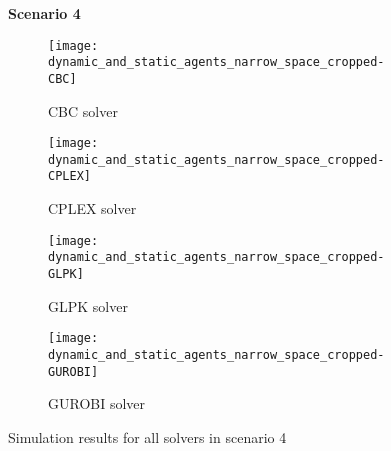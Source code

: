 \begin{figure}[H]
    \centering
    \textbf{Scenario 4}\par \medskip
    \begin{subfigure}{0.49\textwidth}
        \centering
        \texttt{[image: dynamic\_and\_static\_agents\_narrow\_space\_cropped-CBC]}
        \caption{CBC solver}
    \end{subfigure}
    \begin{subfigure}{0.49\textwidth}
        \centering
        \texttt{[image: dynamic\_and\_static\_agents\_narrow\_space\_cropped-CPLEX]}
        \caption{CPLEX solver}
    \end{subfigure}
    \begin{subfigure}{0.49\textwidth}
        \centering
        \texttt{[image: dynamic\_and\_static\_agents\_narrow\_space\_cropped-GLPK]}
        \caption{GLPK solver}
    \end{subfigure}
    \begin{subfigure}{0.49\textwidth}
        \centering
        \texttt{[image: dynamic\_and\_static\_agents\_narrow\_space\_cropped-GUROBI]}
        \caption{GUROBI solver}
    \end{subfigure}
    \caption{Simulation results for all solvers in scenario 4}
	\label{fig:dynamic_and_static_agents_narrow_space_cropped}
\end{figure}

